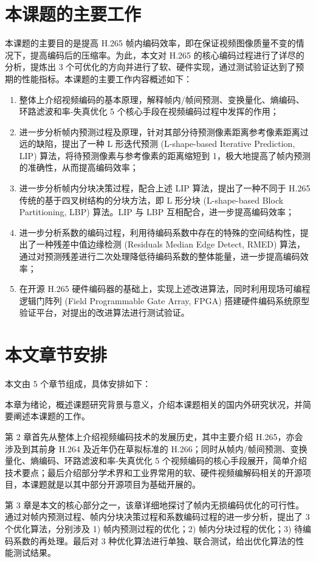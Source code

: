 \section{本课题的主要工作}
本课题的主要目的是提高 H.265 帧内编码效率，即在保证视频图像质量不变的情况下，提高编码后的压缩率。为此，本文对 H.265 的核心编码过程进行了详尽的分析，提炼出 3 个可优化的方向并进行了软、硬件实现，通过测试验证达到了预期的性能指标。本课题的主要工作内容概述如下：
\begin{enumerate}
    \item 整体上介绍视频编码的基本原理，解释帧内/帧间预测、变换量化、熵编码、环路滤波和率-失真优化 5 个核心手段在视频编码过程中发挥的作用；
    \item 进一步分析帧内预测过程及原理，针对其部分待预测像素距离参考像素距离过远的缺陷，提出了一种 L 形迭代预测 (L-shape-based Iterative Prediction, LIP) 算法，将待预测像素与参考像素的距离缩短到 1，极大地提高了帧内预测的准确性，从而提高编码效率；
    \item 进一步分析帧内分块决策过程，配合上述 LIP 算法，提出了一种不同于 H.265 传统的基于四叉树结构的分块方法，即 L 形分块 (L-shape-based Block Partitioning, LBP) 算法。LIP 与 LBP 互相配合，进一步提高编码效率；
    \item 进一步分析系数的编码过程，利用待编码系数中存在的特殊的空间结构性，提出了一种残差中值边缘检测 (Residuals Median Edge Detect, RMED) 算法，通过对预测残差进行二次处理降低待编码系数的整体能量，进一步提高编码效率；
    \item 在开源 H.265 硬件编码器的基础上，实现上述改进算法，同时利用现场可编程逻辑门阵列 (Field Programmable Gate Array, FPGA) 搭建硬件编码系统原型验证平台，对提出的改进算法进行测试验证。
\end{enumerate}

\section{本文章节安排}
本文由 5 个章节组成，具体安排如下：

本章为绪论，概述课题研究背景与意义，介绍本课题相关的国内外研究状况，并简要阐述本课题的工作。

第 2 章首先从整体上介绍视频编码技术的发展历史，其中主要介绍 H.265，亦会涉及到其前身 H.264 及近年仍在草拟标准的 H.266；同时从帧内/帧间预测、变换量化、熵编码、环路滤波和率-失真优化 5 个视频编码的核心手段展开，简单介绍技术要点；最后介绍部分学术界和工业界常用的软、硬件视频编解码相关的开源项目，本课题就是以其中部分开源项目为基础开展的。

第 3 章是本文的核心部分之一，该章详细地探讨了帧内无损编码优化的可行性。通过对帧内预测过程、帧内分块决策过程和系数编码过程的进一步分析，提出了 3 个优化算法，分别涉及 1) 帧内预测过程的优化；2) 帧内分块过程的优化；3) 待编码系数的再处理。最后对 3 种优化算法进行单独、联合测试，给出优化算法的性能测试结果。


